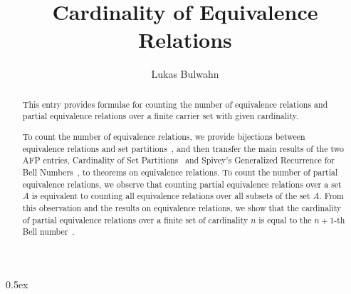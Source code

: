 \documentclass[11pt,a4paper]{article}
\begin{document}
\title{Cardinality of Equivalence Relations}
\author{Lukas Bulwahn}
\maketitle

\begin{abstract}

This entry provides formulae for counting the number of equivalence relations
and partial equivalence relations over a finite carrier set with given
cardinality.

To count the number of equivalence relations, we provide bijections between
equivalence relations and set partitions~\cite{wiki:equiv-relation}, and then
transfer the main results of the two AFP entries, Cardinality of Set
Partitions~\cite{bulwahn-AFP15} and Spivey's Generalized Recurrence for
Bell Numbers~\cite{bulwahn-AFP16}, to theorems on equivalence relations.
To count the number of partial equivalence relations, we observe that
counting partial equivalence relations over a set $A$ is equivalent to counting
all equivalence relations over all subsets of the set $A$. From this observation
and the results on equivalence relations, we show that the cardinality of
partial equivalence relations over a finite set of cardinality $n$ is equal
to the $n+1$-th Bell number~\cite{bell-numbers}.

\end{abstract}

\tableofcontents

\parindent 0pt\parskip 0.5ex



\nocite{*}



\end{document}
